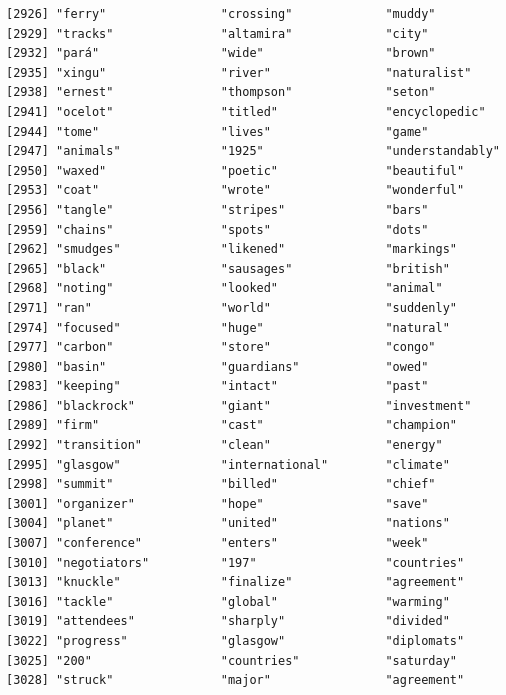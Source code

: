 \documentclass[
  letterpaper,
  DIV=11,
  numbers=noendperiod]{scrartcl}
\begin{document}
\begin{verbatim}
[2926] "ferry"                "crossing"             "muddy"               
[2929] "tracks"               "altamira"             "city"                
[2932] "pará"                 "wide"                 "brown"               
[2935] "xingu"                "river"                "naturalist"          
[2938] "ernest"               "thompson"             "seton"               
[2941] "ocelot"               "titled"               "encyclopedic"        
[2944] "tome"                 "lives"                "game"                
[2947] "animals"              "1925"                 "understandably"      
[2950] "waxed"                "poetic"               "beautiful"           
[2953] "coat"                 "wrote"                "wonderful"           
[2956] "tangle"               "stripes"              "bars"                
[2959] "chains"               "spots"                "dots"                
[2962] "smudges"              "likened"              "markings"            
[2965] "black"                "sausages"             "british"             
[2968] "noting"               "looked"               "animal"              
[2971] "ran"                  "world"                "suddenly"            
[2974] "focused"              "huge"                 "natural"             
[2977] "carbon"               "store"                "congo"               
[2980] "basin"                "guardians"            "owed"                
[2983] "keeping"              "intact"               "past"                
[2986] "blackrock"            "giant"                "investment"          
[2989] "firm"                 "cast"                 "champion"            
[2992] "transition"           "clean"                "energy"              
[2995] "glasgow"              "international"        "climate"             
[2998] "summit"               "billed"               "chief"               
[3001] "organizer"            "hope"                 "save"                
[3004] "planet"               "united"               "nations"             
[3007] "conference"           "enters"               "week"                
[3010] "negotiators"          "197"                  "countries"           
[3013] "knuckle"              "finalize"             "agreement"           
[3016] "tackle"               "global"               "warming"             
[3019] "attendees"            "sharply"              "divided"             
[3022] "progress"             "glasgow"              "diplomats"           
[3025] "200"                  "countries"            "saturday"            
[3028] "struck"               "major"                "agreement"           

\end{verbatim}
\end{document}
